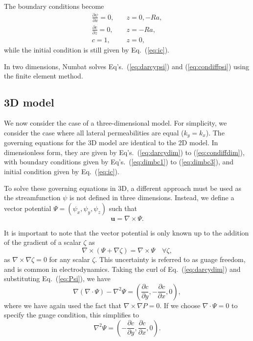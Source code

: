 \documentclass[11pt, a4paper]{csiroreport2012}
\begin{document}
The boundary conditions become
\begin{align}
\frac{\partial \psi}{\partial x} = 0,&  \quad z = 0, -Ra, \\
\frac{\partial c}{\partial z} = 0,& \quad z = -Ra, \\
c = 1,& \quad z = 0,
\label{eq:bcpsi}
\end{align}
while the initial condition is still given by Eq.~(\ref{eq:ic}).

In two dimensions, Numbat solves Eq's.~(\ref{eq:darcypsi}) and (\ref{eq:condiffpsi}) using the finite element method.

\subsection{3D model}

We now consider the case of a three-dimensional model. For simplicity, we consider the case where all lateral permeabilities are equal ($k_y = k_x$). The governing equations for the 3D model are identical to the 2D model. In dimensionless form, they are given by Eq's.~(\ref{eq:darcydim}) to (\ref{eq:condiffdim}), with boundary conditions given by Eq's.~(\ref{eq:dimbc1}) to (\ref{eq:dimbc3}), and initial condition given by Eq.~(\ref{eq:ic}).

To solve these governing equations in 3D, a different approach must be used as the streamfunction $\psi$ is not defined in three dimensions. Instead, we define a vector potential $\Psi = (\psi_x, \psi_y, \psi_z)$ such that
\begin{equation}
\mathbf{u} = \nabla \times \Psi.
\label{eq:Psi}
\end{equation}

It is important to note that the vector potential is only known up to the addition of the gradient of a scalar $\zeta$ as
\begin{equation}
\nabla \times \left( \Psi + \nabla \zeta \right) = \nabla \times \Psi \quad \forall \zeta,
\end{equation}
as $\nabla \times \nabla \zeta = 0$ for any scalar $\zeta$. This uncertainty is referred to as guage freedom, and is common in electrodynamics. Taking the curl of Eq.~(\ref{eq:darcydim}) and substituting Eq.~(\ref{eq:Psi}), we have
\begin{equation}
\nabla(\nabla \cdot \Psi) - \nabla^2 \Psi = \left(\frac{\partial c}{\partial y}, - \frac{\partial c}{\partial x}, 0\right),
\end{equation}
where we have again used the fact that $\nabla \times \nabla P = 0$. If we choose $\nabla \cdot \Psi = 0$ to specify the guage condition, this simplifies to
\begin{equation}
\nabla^2 \Psi = \left(-\frac{\partial c}{\partial y},  \frac{\partial c}{\partial x}, 0\right).
\label{eq:poisson}
\end{equation}
\end{document}
